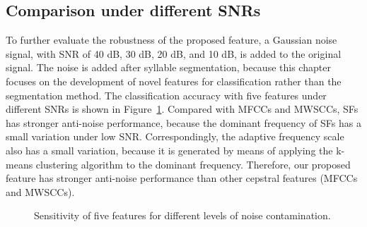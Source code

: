 \begin{table}[htb!]
\centering
\caption{Classification accuracy (\%) for classifying different number of frog species with four feature sets.}
\label{tab:manySpecies}
\end{table}


\subsection{Comparison under different SNRs}
To further evaluate the robustness of the proposed feature, a Gaussian noise signal, with SNR of 40 dB, 30 dB, 20 dB, and 10 dB, is added to the original signal. The noise is added after syllable segmentation, because this chapter focuses on the development of novel features for classification rather than the segmentation method. The classification accuracy with five features under different SNRs is shown in Figure~\ref{fig:snr}. Compared with MFCCs and MWSCCs, SFs has stronger anti-noise performance, because the dominant frequency of SFs has a small variation under low SNR. Correspondingly, the adaptive frequency scale also has a small variation, because it is generated by means of applying the k-means clustering algorithm to the dominant frequency. Therefore, our proposed feature has stronger anti-noise performance than other cepstral features (MFCCs and MWSCCs). 

\begin{figure}[htb!] %
\caption{Sensitivity of five features for
different levels of noise contamination.}
\label{fig:snr} 
\end{figure}

